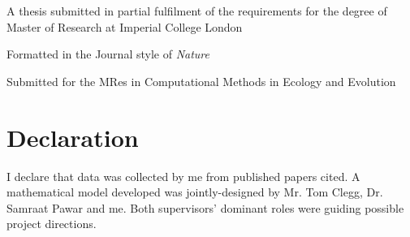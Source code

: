 \documentclass[../thesis.tex]{subfiles} %
\begin{document}
\maketitle
\vspace{15cm}
\begin{center}
    A thesis submitted in partial fulfilment of the requirements for the degree of Master of Research at Imperial College London
    
    Formatted in the Journal style of \textit{Nature}
    
    Submitted for the MRes in Computational Methods in Ecology and Evolution
\end{center}
\clearpage

\section{Declaration}
I declare that data was collected by me from published papers cited.  A mathematical model developed was jointly-designed by Mr. Tom Clegg, Dr. Samraat Pawar and me.  Both supervisors' dominant roles were guiding possible project directions.
\tableofcontents
\listoffigures
\listoftables
\end{document}
